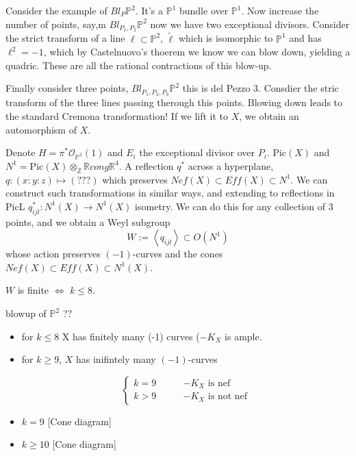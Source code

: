 Consider the example of $Bl_P \mathbb{P}^2$.
It's a $\mathbb{P}^1$ bundle over
$\mathbb{P}^1$. Now increase the number of
points, say,m $Bl_{P_1,P_2}\mathbb{P}^2$
now we have two exceptional divisors.
Consider the strict transform of a line
$\ell \subset \mathbb{P}^2$, $\tilde{\ell}$
which is isomorphic to $\mathbb{P}^1$
and has $\ell^2 = -1$, which
by Castelnuovo's thoerem we know
we can blow down, yielding a quadric.
These are all the rational contractions
of this blow-up.

Finally consider three points,
$Bl_{P_1,P_2,P_3}\mathbb{P}^2$
this is del Pezzo 3.
Consdier the stric transform of the
three lines passing therough this points.
Blowing down leads to the standard
Cremona transformation!
If we lift it to $X$, we obtain
an automorphism of $X$.

Denote $H=\pi^*  \mathcal{O}_{\mathbb{P}^2}
(1)$ and $E_i$ the exceptional divisor over
$P_i$.
$\text{Pic}(X)$ and $N^1=\text{Pic}(X)
\otimes_\mathbb{Z} \mathbb{R} cong
\mathbb{R}^4$. A reflection $q^*$
across a hyperplane,
$q: (x:y:z) \mapsto (? ? ? )$
which preserves $Nef(X) \subset Eff(X)
\subset N^1$.
We can construct such transformations
in similar ways, and extending to 
reflections in $\text{Pic}$L
$q_{ij l}^*:N^1(X) \to N^1(X)$ isometry.
We can do this for any collection of 3
points, and we obtain a Weyl subgroup
$$
W := \left\langle{}q_{ij l}\right\rangle{} \subset
O(N^1)
$$
whose action preserves $(-1)$-curves
and the cones $Nef(X)\subset E ff(X) \subset
N^1(X)$.

$W$ is finite $\iff$ $k \leq  8$.

\begin{theorem}
\label{theorem-nagata}
blowup of $\mathbb{P}^2$ ??
\end{theorem}

\begin{itemize}
\item 

for $k \leq  8$ X has finitely many (-1)
curves ($-K_X$ is ample.

\item for $k \geq 9$, $X$ has inifintely many
$(-1)$-curves

$$
\begin{cases}
k=9\qquad &-K_X \text{ is nef} \\
k>9\qquad &-K_X\text{ is not nef}
\end{cases}
$$
\item $k=9$ [Cone diagram]

\item $k\geq 10$ [Cone diagram]

\end{itemize}

